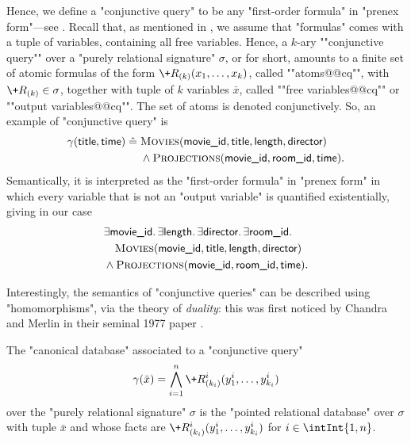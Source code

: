 Hence, we define a \AP"conjunctive query" to be
any "first-order formula" in "prenex form"---see .
Recall that, as mentioned in ,
we assume that "formulas" comes with a tuple of variables,
containing all free variables.
Hence, a $k$-ary \AP""conjunctive query"" over a "purely relational signature" $\sigma$,
or  for short, amounts to a finite set
of atomic formulas of the form $\+R_{(k)}(x_1,\hdots,x_k)$,
called ""atoms@@cq"", with $\+R_{(k)} \in \sigma$,
together with tuple of $k$ variables $\bar x$, called ""free variables@@cq""
or ""output variables@@cq"". The set of atoms is denoted conjunctively.
So, an example of "conjunctive query" is
\begin{align*}
	\gamma(\textsf{title}, \textsf{time}) \mathrel{\hat{=}}\; 
	& \textsc{Movies}(\textsf{movie\_id}, \textsf{title}, \textsf{length}, \textsf{director}) \\
	& \land
	\textsc{Projections}(\textsf{movie\_id}, \textsf{room\_id}, \textsf{time}).
\end{align*} 
Semantically, it is interpreted as the "first-order formula" in "prenex form"
in which every variable that is not an "output variable" is quantified existentially,
giving in our case
\begin{align*}
	& \exists \textsf{movie\_id}.\, 
	\exists \textsf{length}.\, 
	\exists \textsf{director}.\,
	\exists \textsf{room\_id}.\, \\
	& \hphantom{\land~} \textsc{Movies}(\textsf{movie\_id}, \textsf{title}, \textsf{length}, \textsf{director}) \\
	& \land
	\textsc{Projections}(\textsf{movie\_id}, \textsf{room\_id}, \textsf{time}).
\end{align*} 

Interestingly, the semantics of "conjunctive queries" can be described using "homomorphisms",
via the theory of \emph{duality}: this was first noticed by Chandra and Merlin in
their seminal 1977 paper \cite{ChandraMerlin1977Implementation}.
\begin{definition}
	The "canonical database" associated to a "conjunctive query"
	\[
		\gamma(\bar x) = \bigwedge_{i=1}^n \+R^i_{(k_i)}(y^i_1,\dotsc,y^i_{k_i})
	\]
	over the "purely relational signature" $\sigma$ is the "pointed relational database"
	over $\sigma$ with tuple $\bar x$ and whose facts are
	$\+R^i_{(k_i)}(y^i_1,\dotsc,y^i_{k_i})$ for $i \in \intInt{1,n}$.
\end{definition}

